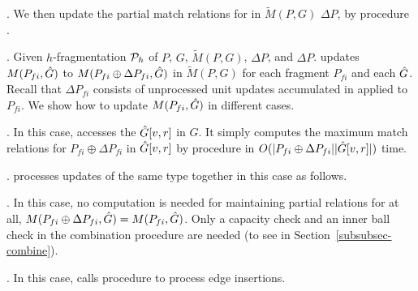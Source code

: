 
. We then update the partial match relations for \affballsx in $\tilde{M}(P,G)$ \wrt $\Delta P$,
by procedure \incmatch.


. Given $h$-fragmentation ${\cal P}_{h}$ of $P$, $G$, $\tilde{M}(P,G)$, $\Delta P$, \upl and \affballsx \wrt $\Delta P$.
\incmatch updates $M(P_{fi}, \hat{G}{})$ to $M(P_{fi}\oplus\Delta P_{fi}, \hat{G}{})$ in $\tilde{M}(P,G)$ for each fragment $P_{fi}$ and each \affballx $\hat{G}{}$.
Recall that $\Delta P_{fi}$ consists of unprocessed unit updates accumulated in \upl applied to $P_{fi}$.
We show how to update $M(P_{fi}, \hat{G}{})$ in different cases.




.
In this case, \incmatch accesses the \affballx $\hat{G}{[v,r]}$ in $G$.
It simply computes the maximum match relations for $P_{fi}\oplus \Delta P_{fi}$ in $\hat{G}{[v,r]}$
by procedure \rgraphsim in $O(|P_{fi}\oplus \Delta P_{fi}||\hat{G}{[v,r]}|)$ time.

.
\incmatch processes updates of the same type together in this case as follows.

.
In this case, no computation is needed for maintaining partial relations for \affballsx at all,
\ie $M(P_{fi}\oplus\Delta P_{fi}, \hat{G}{}) = M(P_{fi}, \hat{G}{})$.
Only a capacity check and an inner ball check in the combination procedure are needed (to see in Section~\ref{subsubsec-combine}).




.
In this case, \incmatch calls procedure \patedgeinsert to process edge insertions.



